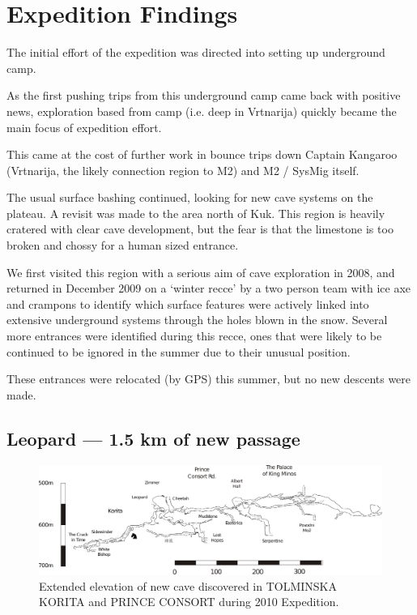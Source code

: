 \hypertarget{expedition-findings-1}{%
\section{Expedition Findings}\label{expedition-findings-1}}

The initial effort of the expedition was directed into setting up
underground camp.

As the first pushing trips from this underground camp came back with
positive news, exploration based from camp (i.e. deep in Vrtnarija)
quickly became the main focus of expedition effort.

This came at the cost of further work in bounce trips down Captain
Kangaroo (Vrtnarija, the likely connection region to M2) and M2 / SysMig
itself.

The usual surface bashing continued, looking for new cave systems on the
plateau. A revisit was made to the area north of Kuk. This region is
heavily cratered with clear cave development, but the fear is that the
limestone is too broken and chossy for a human sized entrance.

We first visited this region with a serious aim of cave exploration in
2008, and returned in December 2009 on a `winter recce' by a two person
team with ice axe and crampons to identify which surface features were
actively linked into extensive underground systems through the holes
blown in the snow. Several more entrances were identified during this
recce, ones that were likely to be continued to be ignored in the summer
due to their unusual position.

These entrances were relocated (by GPS) this summer, but no new descents
were made.

\hypertarget{leopard-1.5-km-of-new-passage}{%
\subsection{Leopard --- 1.5 km of new
passage}\label{leopard-1.5-km-of-new-passage}}

\begin{figure}
\centering
\includegraphics[width=0.9\columnwidth]{2010/2010_new_stuff_extended_extraction}
\caption{Extended elevation of new cave discovered in \textsc{TOLMINSKA KORITA} and \textsc{PRINCE
CONSORT} during 2010 Expedition.}
\end{figure}

